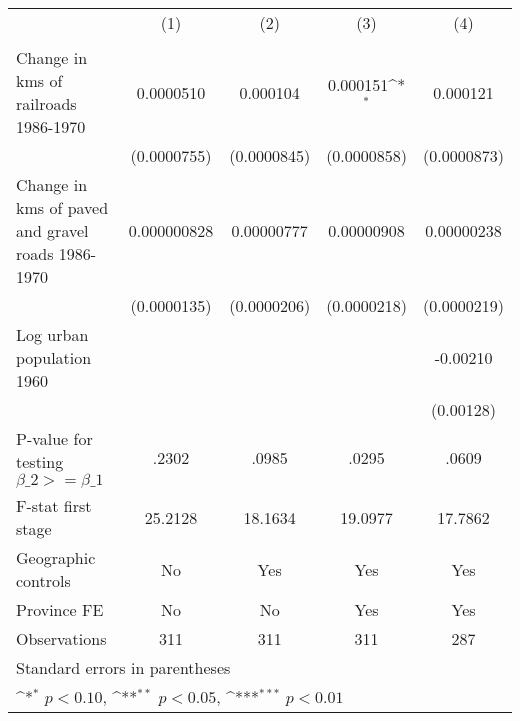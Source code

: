 {
\def\sym#1{\ifmmode^{#1}\else\(^{#1}\)\fi}
\begin{tabular}{l*{4}{c}}
\hline\hline
                &\multicolumn{1}{c}{(1)}&\multicolumn{1}{c}{(2)}&\multicolumn{1}{c}{(3)}&\multicolumn{1}{c}{(4)}\\
                &\multicolumn{1}{c}{}&\multicolumn{1}{c}{}&\multicolumn{1}{c}{}&\multicolumn{1}{c}{}\\
\hline
Change in kms of railroads 1986-1970&0.0000510         & 0.000104         & 0.000151\sym{*}  & 0.000121         \\
                &(0.0000755)         &(0.0000845)         &(0.0000858)         &(0.0000873)         \\
[1em]
Change in kms of paved and gravel roads 1986-1970&0.000000828         &0.00000777         &0.00000908         &0.00000238         \\
                &(0.0000135)         &(0.0000206)         &(0.0000218)         &(0.0000219)         \\
[1em]
Log urban population 1960&                  &                  &                  & -0.00210         \\
                &                  &                  &                  &(0.00128)         \\
\hline
P-value for testing $\beta\_{2} >= \beta\_{1}$&    .2302         &    .0985         &    .0295         &    .0609         \\
F-stat first stage&  25.2128         &  18.1634         &  19.0977         &  17.7862         \\
Geographic controls&       No         &      Yes         &      Yes         &      Yes         \\
Province FE     &       No         &       No         &      Yes         &      Yes         \\
Observations    &      311         &      311         &      311         &      287         \\
\hline\hline
\multicolumn{5}{l}{\footnotesize Standard errors in parentheses}\\
\multicolumn{5}{l}{\footnotesize \sym{*} \(p<0.10\), \sym{**} \(p<0.05\), \sym{***} \(p<0.01\)}\\
\end{tabular}
}
